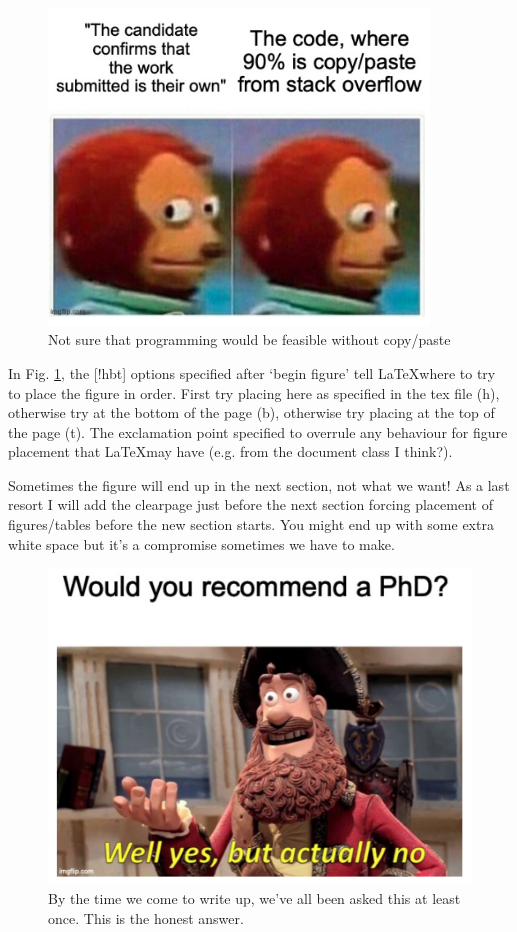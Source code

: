 \begin{figure}[!hbt]
    \centering
    \includegraphics[width=0.9\textwidth]{chapter2_figures/code.png}
    \caption{Not sure that programming would be feasible without copy/paste}
    \label{fig:code}
\end{figure}

In Fig. \ref{fig:code}, the [!hbt] options specified after `begin figure' tell \LaTeX where to try to place the figure in order. First try placing here as specified in the tex file (h), otherwise try at the bottom of the page (b), otherwise try placing at the top of the page (t). The exclamation point specified to overrule any behaviour for figure placement that \LaTeX may have (e.g. from the document class I think?).

Sometimes the figure will end up in the next section, not what we want! As a last resort I will add the clearpage just before the next section forcing placement of figures/tables before the new section starts. You might end up with some extra white space but it's a compromise sometimes we have to make.


\begin{figure}[!hbt]
    \centering
    \includegraphics[width=\textwidth]{chapter2_figures/yesbutno.png}
    \caption{By the time we come to write up, we've all been asked this at least once. This is the honest answer.}
    \label{fig:yes but no}
\end{figure}

